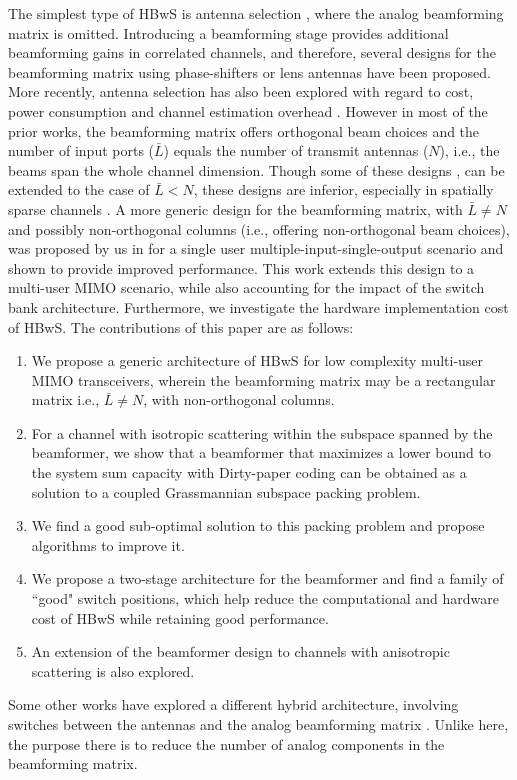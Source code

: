 \documentclass[journal,comsoc]{IEEEtran}
\begin{document}
The simplest type of HBwS is antenna selection \cite{Paulraj, Molisch_mag, Magazine_nosratinia}, where the analog beamforming matrix is omitted. Introducing a beamforming stage provides additional beamforming gains in correlated channels, and therefore, several designs for the beamforming matrix using phase-shifters \cite{Molisch_FFTshift, Sudarshan} or lens antennas \cite{Zeng2014, Gao2017} have been proposed. More recently, antenna selection has also been explored with regard to cost, power consumption and channel estimation overhead \cite{Rial2016}. However in most of the prior works, the beamforming matrix offers orthogonal beam choices and the number of input ports ($\bar{L}$) equals the number of transmit antennas ($N$), i.e., the beams span the whole channel dimension. Though some of these designs \cite{Molisch_VarPhaseShift, Sudarshan}, can be extended to the case of $\bar{L} < N$, these designs are inferior, especially in spatially sparse channels \cite{Vishnu_ICC2017}. 
%
%
A more generic design for the beamforming matrix, with $\bar{L} \neq N$ and possibly non-orthogonal columns (i.e., offering non-orthogonal beam choices), was proposed by us in \cite{Vishnu_ICC2017} for a single user multiple-input-single-output scenario and shown to provide improved performance. This work extends this design to a multi-user MIMO scenario, while also accounting for the impact of the switch bank architecture. Furthermore, we investigate the hardware implementation cost of HBwS. 
The contributions of this paper are as follows:
\begin{enumerate}
\item We propose a generic architecture of HBwS for low complexity multi-user MIMO transceivers, wherein the beamforming matrix may be a rectangular matrix i.e., $\bar{L} \neq N$, with non-orthogonal columns. 
\item For a channel with isotropic scattering within the subspace spanned by the beamformer,
we show that a beamformer that maximizes a lower bound to the system sum capacity with Dirty-paper coding can be obtained as a solution to a coupled Grassmannian subspace packing problem. 
\item We find a good sub-optimal solution to this packing problem and propose algorithms to improve it. 
\item We propose a two-stage architecture for the beamformer and find a family of ``good" switch positions, which help reduce the computational and hardware cost of HBwS while retaining good performance. 
\item An extension of the beamformer design to channels with anisotropic scattering is also explored.
\end{enumerate}
Some other works have explored a different hybrid architecture, involving switches between the antennas and the analog beamforming matrix \cite{Alkhateeb2016}. Unlike here, the purpose there is to reduce the number of analog components in the beamforming matrix. 
\end{document}

